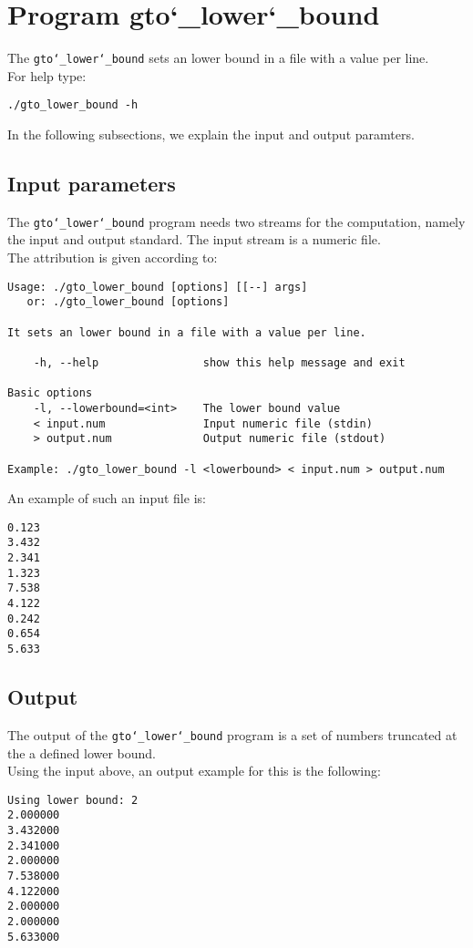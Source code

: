 \section{Program gto\char`_lower\char`_bound}
The \texttt{gto\char`_lower\char`_bound} sets an lower bound in a file with a value per line.\\
For help type:
\begin{lstlisting}
./gto_lower_bound -h
\end{lstlisting}
In the following subsections, we explain the input and output paramters.

\subsection*{Input parameters}

The \texttt{gto\char`_lower\char`_bound} program needs two streams for the computation, namely the input and output standard. The input stream is a numeric file.\\
The attribution is given according to:
\begin{lstlisting}
Usage: ./gto_lower_bound [options] [[--] args]
   or: ./gto_lower_bound [options]

It sets an lower bound in a file with a value per line.

    -h, --help                show this help message and exit

Basic options
    -l, --lowerbound=<int>    The lower bound value
    < input.num               Input numeric file (stdin)
    > output.num              Output numeric file (stdout)

Example: ./gto_lower_bound -l <lowerbound> < input.num > output.num
\end{lstlisting}
An example of such an input file is:
\begin{lstlisting}
0.123
3.432
2.341
1.323
7.538
4.122
0.242
0.654
5.633
\end{lstlisting}

\subsection*{Output}
The output of the \texttt{gto\char`_lower\char`_bound} program is a set of numbers truncated at the a defined lower bound.\\
Using the input above, an output example for this is the following:
\begin{lstlisting}
Using lower bound: 2
2.000000
3.432000
2.341000
2.000000
7.538000
4.122000
2.000000
2.000000
5.633000
\end{lstlisting}